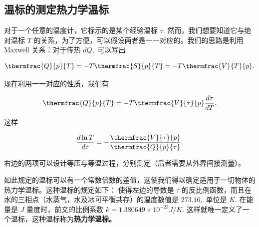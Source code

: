 \subsection{温标的测定\quad 热力学温标}
对于一个任意的温度计，它标示的是某个经验温标 $\tau.$ 然而，我们想要知道它与绝对温标 $T$ 的关系，为了方便，可以假设两者是一一对应的。我们的思路是利用 Maxwell 关系：对于传热 $dQ,$ 可以写出
\begin{linenomath}\begin{equation}
\thermfrac{Q}{p}{T} = -T\thermfrac{S}{p}{T} = -T\thermfrac{V}{T}{p}.
\end{equation}\end{linenomath}
现在利用一一对应的性质，我们有
\begin{linenomath}\begin{equation}
\thermfrac{Q}{p}{T} = -T\thermfrac{V}{\tau}{p} \frac{d\tau}{dT}.
\end{equation}\end{linenomath}
这样 \begin{linenomath}\begin{equation}
\frac{d\ln T}{d\tau} = -\frac{\thermfrac{V}{\tau}{p}}{\thermfrac{Q}{p}{\tau}}.
\end{equation}\end{linenomath}
右边的两项可以设计等压与等温过程，分别测定（后者需要从外界间接测量）。

如此规定的温标可以有一个常数倍数的差值，这使我们得以确定适用于一切物体的热力学温标。这种温标的规定如下： 使得左边的导数是 $\tau$ 的反比例函数，而且在水的三相点（水蒸气，水及冰可平衡共存）的温度数值是 $273.16,$ 单位是 $K.$ 在能量是 $J$ 量度时，前文的比例系数 $k=1.380649\times 10^{−23} J/K.$ 这样就唯一定义了一个温标，这种温标称为\textbf{热力学温标。} 

